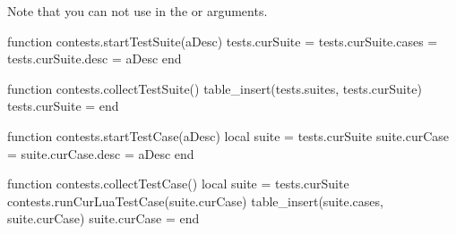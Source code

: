 
\startchapter[title=Unit Test Suites]

Note that you can not use  in the \type{\startTestSuite} or 
\type{\startTestCase} arguments. 

\startMkIVCode

\def\startTestSuite[#1]{%
  \startsubsection[title=Test Suite: #1]
  \directlua{thirddata.contests.startTestSuite("#1")}
}

\def\stopTestSuite{%
  \stopsubsection%
  \directlua{thirddata.contests.collectTestSuite()}
}

\def\startTestCase[#1]{%
  \startsubsubsection[title=Test Case: #1]
  \directlua{thirddata.contests.startTestCase("#1")}
}

\def\stopTestCase{%
  \stopsubsubsection%
  \directlua{thirddata.contests.collectTestCase()}
}

\stopMkIVCode

\startLuaCode

function contests.startTestSuite(aDesc)
  tests.curSuite       = {}
  tests.curSuite.cases = {}
  tests.curSuite.desc  = aDesc
end

function contests.collectTestSuite()
  table_insert(tests.suites, tests.curSuite)
  tests.curSuite = {}
end

function contests.startTestCase(aDesc)
  local suite = tests.curSuite
  suite.curCase = {}
  suite.curCase.desc = aDesc
end

function contests.collectTestCase()
  local suite = tests.curSuite
  contests.runCurLuaTestCase(suite.curCase)
  table_insert(suite.cases, suite.curCase)
  suite.curCase = {}
end

\stopLuaCode

\stopchapter